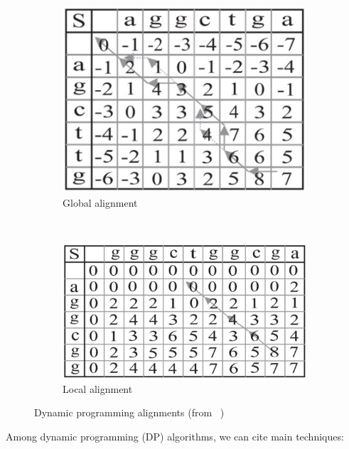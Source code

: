  \begin{figure}[ht!]
 	\centering
 	\begin{subfigure}[t]{0.5\textwidth}
 		\centering
 		\includegraphics[height=0.5\textwidth]{global_align}
 		\caption{Global alignment}
 		\label{fig:global_align}
 	\end{subfigure}%
 	~ 
 	\begin{subfigure}[t]{0.5\textwidth}
 		\centering
 		\includegraphics[height=0.5\textwidth]{local_align}
 		\caption{Local alignment}
 		\label{fig:local_align}
 	\end{subfigure}
 	\caption{Dynamic programming alignments (from ~\cite{Aluru:2005:HCM:1121650}) }
 	\label{fig:dpmatrix}
 \end{figure}

Among dynamic programming (DP) algorithms, we can cite main techniques:


